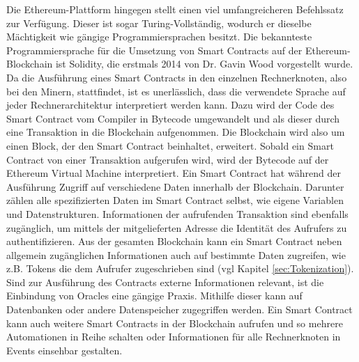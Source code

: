 Die Ethereum-Plattform hingegen stellt einen viel umfangreicheren Befehlssatz
zur Verfügung. Dieser ist sogar Turing-Vollständig, wodurch er dieselbe Mächtigkeit wie gängige
Programmiersprachen besitzt.
Die bekannteste Programmiersprache für die Umsetzung von Smart Contracts auf der Ethereum-Blockchain 
ist Solidity, die erstmals 2014 von Dr. Gavin Wood vorgestellt wurde. Da die Ausführung eines Smart Contracts
in den einzelnen Rechnerknoten, also bei den Minern, stattfindet, ist es unerlässlich, 
dass die verwendete Sprache auf jeder Rechnerarchitektur interpretiert werden kann.
Dazu wird der Code des Smart Contract vom Compiler in 
Bytecode umgewandelt und als dieser durch eine Transaktion in die Blockchain 
aufgenommen. %
Die Blockchain wird also um einen Block, der den Smart Contract beinhaltet, erweitert.
Sobald ein Smart Contract von einer Transaktion aufgerufen wird, wird der Bytecode 
auf der Ethereum Virtual Machine interpretiert.
Ein Smart Contract hat während der Ausführung Zugriff auf verschiedene Daten innerhalb der 
Blockchain. 
Darunter zählen alle spezifizierten Daten im Smart Contract selbst, wie eigene Variablen
und Datenstrukturen. Informationen der aufrufenden Transaktion sind ebenfalls zugänglich, um 
mittels der mitgelieferten Adresse die Identität des Aufrufers
zu authentifizieren. Aus der gesamten Blockchain kann ein Smart Contract neben
allgemein zugänglichen Informationen auch auf bestimmte Daten zugreifen, wie z.B. 
Tokens die dem Aufrufer zugeschrieben sind (vgl Kapitel \ref{sec:Tokenization}).
Sind zur Ausführung des Contracts externe Informationen relevant, ist die Einbindung von Oracles
eine gängige Praxis. Mithilfe dieser kann auf Datenbanken oder andere Datenspeicher zugegriffen werden.
Ein Smart Contract kann auch weitere Smart Contracts in der Blockchain aufrufen und so 
mehrere Automationen in Reihe schalten oder Informationen für alle Rechnerknoten in Events
einsehbar gestalten.
\cite[p.~57ff]{fill2020blockchain}

